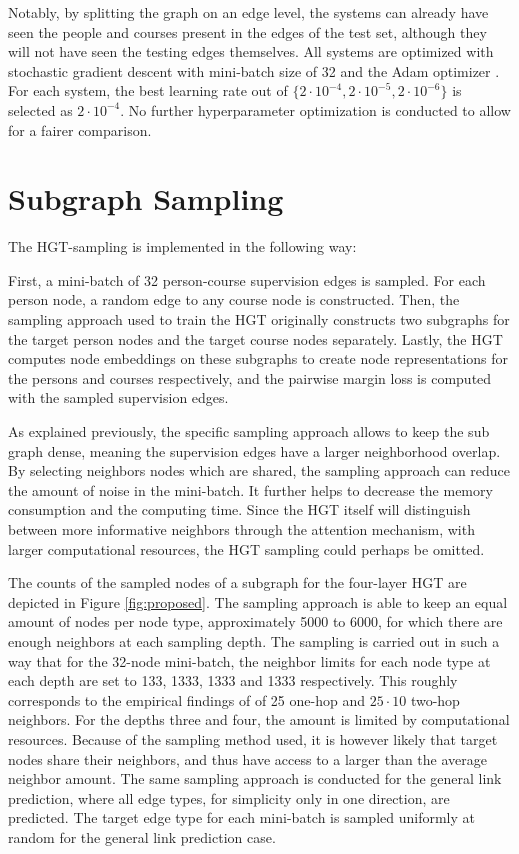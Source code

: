 Notably, by splitting the graph on an edge level, the systems can already have seen the people and courses  present in the edges of the test set, although they will not have seen the testing edges themselves. All systems are optimized with stochastic gradient descent \parencite{robbins1951stochastic} with mini-batch size of 32 and the Adam optimizer \parencite{kingma2014adam}. For each system, the best learning rate out of $\{2\cdot10^{-4}, 2\cdot10^{-5}, 2\cdot10^{-6}\}$ is selected as $2\cdot10^{-4}$. No further hyperparameter optimization is conducted to allow for a fairer comparison. 

\section{Subgraph Sampling}
The HGT-sampling is implemented in the following way:

First, a mini-batch of 32 person-course supervision edges is sampled. For each person node, a random edge to any course node is constructed. Then, the sampling approach used to train the HGT originally \parencite{hu2020heterogeneous} constructs two subgraphs for the target person nodes and the target course nodes separately. Lastly, the HGT computes node embeddings on these subgraphs to create node representations for the persons and courses respectively, and the pairwise margin loss is computed with the sampled supervision edges.

As explained previously, the specific sampling approach allows to keep the sub graph dense, meaning the supervision edges have a larger neighborhood overlap.  By selecting neighbors nodes which are shared, the sampling approach can reduce the amount of noise in the mini-batch.  It further helps to decrease the memory consumption and the computing time. Since the HGT itself will  distinguish between more informative neighbors through the attention mechanism, with larger computational resources, the HGT sampling could perhaps be omitted. 

The counts of the sampled nodes of a subgraph for the four-layer HGT are depicted in Figure \ref{fig:proposed}. The sampling approach is able to keep an equal amount of nodes per node type, approximately 5000 to 6000, for which there are enough neighbors at each sampling depth. The sampling is carried out in such a way that for the 32-node mini-batch, the neighbor limits for each node type at each depth are set to 133, 1333, 1333 and 1333 respectively. This roughly corresponds to the empirical findings of \parencite{hamilton2017inductive} of 25 one-hop and $25\cdot10$ two-hop neighbors. For the depths three and four, the amount is limited by computational resources.  
Because of the sampling method used, it is however likely that target nodes share their neighbors, and thus have access to a larger than the average neighbor amount. 
The same sampling approach is conducted for the general link prediction, where all edge types, for simplicity only in one direction, are predicted. The target edge type for each mini-batch is sampled uniformly at random for the general link prediction case. 





